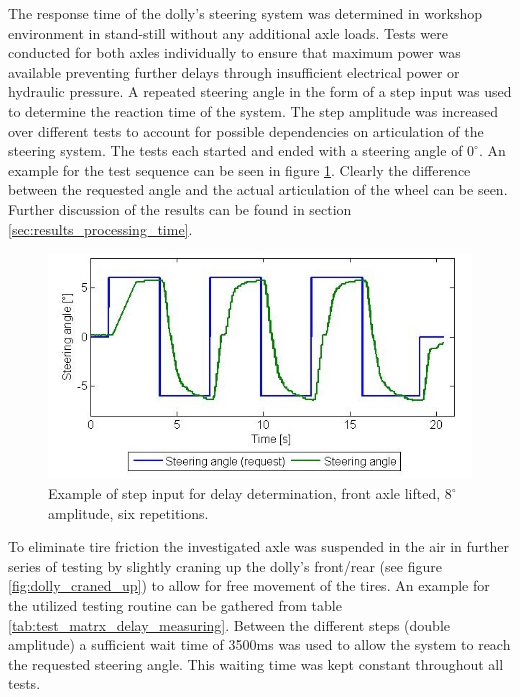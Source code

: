 \documentclass[ExampleMasters.tex]{subfiles}
\begin{document}
The response time of the dolly's steering system was determined in workshop environment in stand-still without any additional axle loads. Tests were conducted for both axles individually to ensure that maximum power was available preventing further delays through insufficient electrical power or hydraulic pressure. A repeated steering angle in the form of a step input was used to determine the reaction time of the system. The step amplitude was increased over different tests to account for possible dependencies on articulation of the steering system. The tests each started and ended with a steering angle of $0^\circ .$ An example for the test sequence can be seen in figure \ref{fig:example_for_step_input_delay_measuring}. Clearly the difference between the requested angle and the actual articulation of the wheel can be seen. Further discussion of the results can be found in section \ref{sec:results_processing_time}.\\

\begin{figure} [!htb]
\centering
\includegraphics[width=1\linewidth]{figures/example_for_step_input_delay_measuring}
\caption{Example of step input for delay determination, front axle lifted, $8^\circ $ amplitude, six repetitions.}
\label{fig:example_for_step_input_delay_measuring}
\end{figure}


To eliminate tire friction the investigated axle was suspended in the air in further series of testing by slightly craning up the dolly's front/rear (see figure \ref{fig:dolly_craned_up}) to allow for free movement of the tires. An example for the utilized testing routine can be gathered from table \ref{tab:test_matrx_delay_measuring}. Between the different steps (double amplitude) a sufficient wait time of 3500ms was used to allow the system to reach the requested steering angle. This waiting time was kept constant throughout all tests. \\
\end{document}
